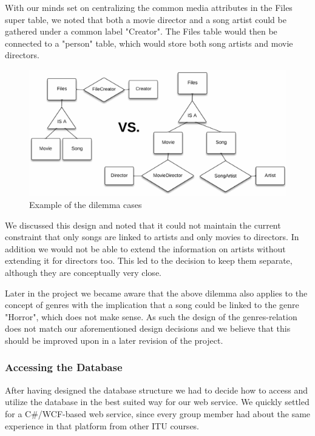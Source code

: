 With our minds set on centralizing the common media attributes in the Files
super table, we noted that both a movie director and a song artist could be
gathered under a common label "Creator". The Files table would then be
connected to a "person" table, which would store both song artists and movie
directors.

\begin{figure}[hbt]
	\centering
	\centerline{\includegraphics{./p1design/dilemma.png}}
	\caption{Example of the dilemma cases}
	\label{fig:erddilemma}
\end{figure}

We discussed this design and noted that it could not maintain the current
constraint that only songs are linked to artists and only movies to directors.
In addition we would not be able to extend the information on artists without
extending it for directors too. This led to the decision to keep them separate,
although they are conceptually very close.

Later in the project we became aware that the above dilemma also applies to the
concept of genres with the implication that a song could be linked to the genre
"Horror", which does not make sense. As such the design of the genres-relation
does not match our aforementioned design decisions and we believe that this
should be improved upon in a later revision of the project.

\subsubsection{Accessing the Database}
\label{sec:databaseaccess}
After having designed the database structure we had to decide how to access and
utilize the database in the best suited way for our web service. We quickly
settled for a C\#/WCF-based web service, since every group member had about the
same experience in that platform from other ITU courses.

